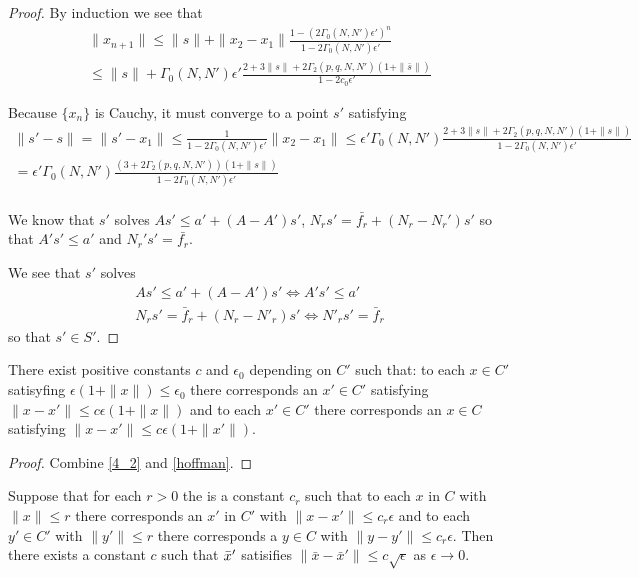 \begin{proof}
By induction we see that
\begin{align*}
\|x_{n+1}\| \le \|s\| + \|x_2 - x_1\|\frac{1 - (2\Gamma_0(N, N')\epsilon')^n}{1 - 2\Gamma_0(N, N') \epsilon'} \\
\le \|s\| + \Gamma_0(N, N')\epsilon'\frac{2 + 3\|s\| + 2\Gamma_2(p, q, N, N')(1 + \|\bar s\|)}{1 - 2c_0\epsilon'}
\end{align*}

Because $\{x_n\}$ is Cauchy, it must converge to a point $s'$ satisfying
\begin{align*}
\|s' - s\| = \|s' - x_1\| \le \frac{1}{1 - 2\Gamma_0(N, N')\epsilon'}\|x_2 - x_1\| \le \epsilon'\Gamma_0(N, N')\frac{2 + 3\|s\| + 2\Gamma_2(p, q, N, N')(1 + \|s\|)}{1-2\Gamma_0(N, N')\epsilon'} \\
= \epsilon'\Gamma_0(N, N')\frac{\left(3 + 2\Gamma_2(p, q, N, N')\right)(1 + \|s\|)}{1-2\Gamma_0(N, N')\epsilon'} \\
\end{align*}

We know that $s'$ solves $As' \le a' + (A - A')s'$, $N_rs' = \bar{f_r} + (N_r - N_r')s'$ so that
$A's' \le a'$ and $N_r's' = \bar {f_r}$.


We see that $s'$ solves 
\begin{align*}
As' \le a' + (A - A')s' \Longleftrightarrow A's'\le a'\\
N_rs' = \bar f_r + (N_r - N'_r)s' \Longleftrightarrow N'_rs' = \bar f_r
\end{align*}
so that $s' \in S'$.

\end{proof}

\begin{theorem}
\label{3_7}
There exist positive constants $c$ and  $\epsilon_0$ depending on $C'$ such that:
to each $x \in C'$ satisyfing $\epsilon(1 + \|x\|) \le \epsilon_0$ there corresponds an $x' \in C'$ satisfying $\|x - x'\| \le c\epsilon(1 + \|x\|)$ and
to each $x' \in C'$ there corresponds an $x \in C$ satisfying $\|x - x'\| \le c \epsilon (1 + \|x'\|)$.
\end{theorem}

\begin{proof}
Combine \cref{4_2} and \cref{hoffman}.
\end{proof}

\begin{theorem}
\label{2_2}
Suppose that for each $r > 0$ the is a constant $c_r$ such that to each 
$x$ in $C$ with $\|x\| \le r$ there corresponds an $x'$ in $C'$ with $\|x-x'\| \le c_r \epsilon$ and 
to each $y' \in C'$ with $\|y'\| \le r$ there corresponds a $y\in C$ with $\|y - y'\| \le c_r \epsilon$.
Then there exists a constant $c$ such that ${{\bar x}}'$ satisifies $\|\bar x - \bar x '\|\le c \sqrt{\epsilon}$ as $\epsilon \to 0$.
\end{theorem}

